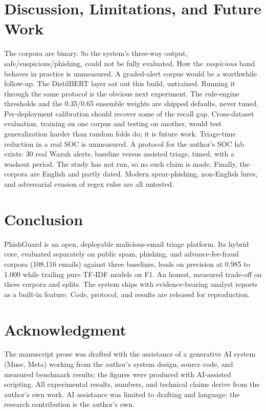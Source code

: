 \documentclass[conference]{IEEEtran}
\begin{document}
\section{Discussion, Limitations, and Future Work}
The corpora are binary. So the system's three-way output,
safe/suspicious/phishing, could not be fully evaluated. How the
\textit{suspicious} band behaves in practice is unmeasured. A graded-alert
corpus would be a worthwhile follow-up. The DistilBERT layer sat out this
build, untrained. Running it through the same protocol is the obvious next
experiment. The rule-engine thresholds and the 0.35/0.65 ensemble weights are
shipped defaults, never tuned. Per-deployment calibration should recover some
of the recall gap. Cross-dataset evaluation, training on one corpus and
testing on another, would test generalization harder than random folds do;
it is future work. Triage-time reduction in a real SOC is unmeasured. A
protocol for the author's SOC lab exists: 30 real Wazuh alerts, baseline
versus assisted triage, timed, with a washout period. The study has not run,
so no such claim is made. Finally, the corpora are English and partly dated.
Modern spear-phishing, non-English lures, and adversarial evasion of regex
rules are all untested.

\section{Conclusion}
PhishGuard is an open, deployable malicious-email triage platform. Its hybrid
core, evaluated separately on public spam, phishing, and advance-fee-fraud
corpora (108,116 emails) against three baselines, leads on precision at
0.985 to 1.000 while trailing pure TF-IDF models on F1. An honest, measured
trade-off on these corpora and splits. The system ships with
evidence-bearing analyst reports as a built-in feature. Code, protocol, and
results are released for reproduction.

\section*{Acknowledgment}
The manuscript prose was drafted with the assistance of a generative AI
system (Muse, Meta) working from the author's system design, source code, and
measured benchmark results; the figures were produced with AI-assisted
scripting. All experimental results, numbers, and technical claims derive
from the author's own work. AI assistance was limited to drafting and
language; the research contribution is the author's own.
\end{document}
